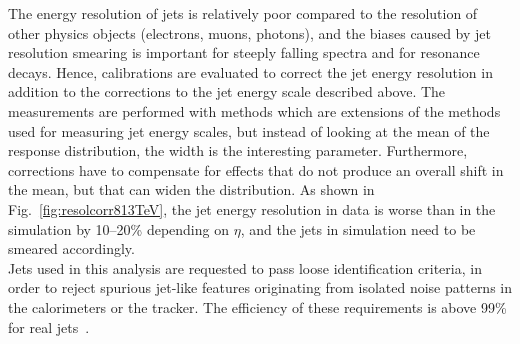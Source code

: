 The energy resolution of jets is relatively poor compared to the resolution of other physics objects (electrons, muons, photons), and the biases caused by jet resolution smearing is important for steeply falling spectra and for resonance decays. Hence, calibrations are evaluated to correct the jet energy resolution in addition to the corrections to the jet energy scale described above. The measurements are performed with methods which are extensions of the methods used for measuring jet energy scales, but instead of looking at the mean of the response distribution, the width is the interesting parameter. Furthermore, corrections have to compensate for effects that do not produce an overall shift in the mean, but that can widen the distribution. As shown in Fig.~\ref{fig:resolcorr813TeV}, the jet energy resolution in data is worse than in the simulation by 10--20\% depending on $\eta$, and the jets in simulation need to be smeared accordingly.\\

Jets used in this analysis are requested to pass loose identification criteria, in order to reject spurious jet-like features originating from isolated noise patterns in the calorimeters or the tracker. The efficiency of these requirements is above 99\% for real jets~\cite{CMS-PAS-JME-10-003}. 

